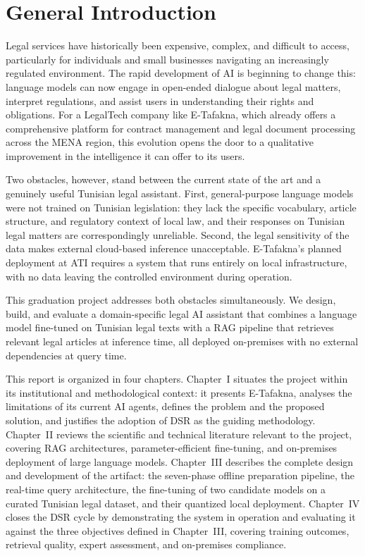 \chapter*{General Introduction}

Legal services have historically been expensive, complex, and difficult to access,
particularly for individuals and small businesses navigating an increasingly
regulated environment. The rapid development of \ac{AI} is beginning to change
this: language models can now engage in open-ended dialogue about legal matters,
interpret regulations, and assist users in understanding their rights and
obligations. For a LegalTech company like E-Tafakna, which already offers a
comprehensive platform for contract management and legal document processing
across the \ac{MENA} region, this evolution opens the door to a qualitative
improvement in the intelligence it can offer to its users.

Two obstacles, however, stand between the current state of the art and a
genuinely useful Tunisian legal assistant. First, general-purpose language models
were not trained on Tunisian legislation: they lack the specific vocabulary,
article structure, and regulatory context of local law, and their responses on
Tunisian legal matters are correspondingly unreliable. Second, the legal
sensitivity of the data makes external cloud-based inference unacceptable.
E-Tafakna's planned deployment at \ac{ATI} requires a system that runs
entirely on local infrastructure, with no data leaving the controlled environment
during operation.

This graduation project addresses both obstacles simultaneously. We design,
build, and evaluate a domain-specific legal \ac{AI} assistant that combines
a language model fine-tuned on Tunisian legal texts with a
\ac{RAG} pipeline that retrieves relevant legal articles at inference time,
all deployed on-premises with no external dependencies at query time.

This report is organized in four chapters. Chapter~I situates the project within
its institutional and methodological context: it presents E-Tafakna, analyses the
limitations of its current \ac{AI} agents, defines the problem and the proposed
solution, and justifies the adoption of \ac{DSR} as the guiding methodology.
Chapter~II reviews the scientific and technical literature relevant to the
project, covering \ac{RAG} architectures, parameter-efficient fine-tuning, and
on-premises deployment of large language models. Chapter~III describes the
complete design and development of the artifact: the seven-phase offline
preparation pipeline, the real-time query architecture, the fine-tuning of two
candidate models on a curated Tunisian legal dataset, and their quantized local
deployment. Chapter~IV closes the \ac{DSR} cycle by demonstrating the system in
operation and evaluating it against the three objectives defined in Chapter~III,
covering training outcomes, retrieval quality, expert assessment, and on-premises
compliance.
